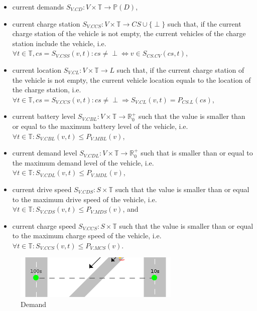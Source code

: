 \documentclass{IEEEtran}
\begin{document}
    \begin{itemize}
        \item current demands $S_{V.CD}: V \times \mathbb{T} \rightarrow \mathbb{P}(D)$,
        \item current charge station $S_{V.CCS}: V \times \mathbb{T} \rightarrow CS \cup \{\perp\}$ such that, if the current charge station of the vehicle is not empty, the current vehicles of the charge station include the vehicle, i.e.\ $\forall t \in \mathbb{T}, cs = S_{V.CSS}(v,t): cs \neq \perp \Leftrightarrow v \in S_{CS.CV}(cs,t)$,
        \item current location $S_{V.CL}: V \times \mathbb{T} \rightarrow L$ such that, if the current charge station of the vehicle is not empty, the current vehicle location equals to the location of the charge station, i.e.\ $\forall t \in \mathbb{T}, cs = S_{V.CCS}(v,t): cs \neq \perp \Rightarrow S_{V.CL}(v,t)=P_{CS.L}(cs)$,
        \item current battery level $S_{V.CBL}: V \times \mathbb{T} \rightarrow \mathbb{R}_0^+$ such that the value is smaller than or equal to the maximum battery level of the vehicle, i.e.\ $\forall t \in \mathbb{T}: S_{V.CBL}(v,t) \leq P_{V.MBL}(v)$,
        \item current demand level $S_{V.CDL}: V \times \mathbb{T} \rightarrow \mathbb{R}_0^+$ such that is smaller than or equal to the maximum demand level of the vehicle, i.e.\ $\forall t \in \mathbb{T}: S_{V.CDL}(v,t) \leq P_{V.MDL}(v)$,
        \item current drive speed $S_{V.CDS}: S \times \mathbb{T}$ such that the value is smaller than or equal to the maximum drive speed of the vehicle, i.e.\ $\forall t \in \mathbb{T}: S_{V.CDS}(v,t) \leq P_{V.MDS}(v)$, and
        \item current charge speed $S_{V.CCS}: S \times \mathbb{T}$ such that the value is smaller than or equal to the maximum charge speed of the vehicle, i.e.\ $\forall t \in \mathbb{T}: S_{V.CCS}(v,t) \leq P_{V.MCS}(v)$.
    \end{itemize}

    \begin{figure}[htbp]
        \centering
        \includegraphics[scale=0.5]{../../concepts/demand.png}
        \caption{Demand}
        \label{fig:demand}
    \end{figure}
\end{document}
